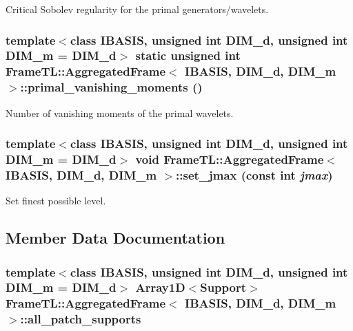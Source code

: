 Critical Sobolev regularity for the primal generators/wavelets. \hypertarget{classFrameTL_1_1AggregatedFrame_3057372270397c20f4705ac9281478e3}{
\subsubsection[{primal\_\-vanishing\_\-moments}]{\setlength{\rightskip}{0pt plus 5cm}template$<$class IBASIS, unsigned int DIM\_\-d, unsigned int DIM\_\-m = DIM\_\-d$>$ static unsigned int {\bf FrameTL::AggregatedFrame}$<$ IBASIS, DIM\_\-d, DIM\_\-m $>$::primal\_\-vanishing\_\-moments ()}}
\label{classFrameTL_1_1AggregatedFrame_3057372270397c20f4705ac9281478e3}


Number of vanishing moments of the primal wavelets. \hypertarget{classFrameTL_1_1AggregatedFrame_d27b0ed0194ad64fcc7c804c9027de33}{
\subsubsection[{set\_\-jmax}]{\setlength{\rightskip}{0pt plus 5cm}template$<$class IBASIS, unsigned int DIM\_\-d, unsigned int DIM\_\-m = DIM\_\-d$>$ void {\bf FrameTL::AggregatedFrame}$<$ IBASIS, DIM\_\-d, DIM\_\-m $>$::set\_\-jmax (const int {\em jmax})}}
\label{classFrameTL_1_1AggregatedFrame_d27b0ed0194ad64fcc7c804c9027de33}


Set finest possible level. 

\subsection{Member Data Documentation}
\hypertarget{classFrameTL_1_1AggregatedFrame_f7a07f1fdbbd8a04b594d043e273ed0f}{
\subsubsection[{all\_\-patch\_\-supports}]{\setlength{\rightskip}{0pt plus 5cm}template$<$class IBASIS, unsigned int DIM\_\-d, unsigned int DIM\_\-m = DIM\_\-d$>$ Array1D$<${\bf Support}$>$ {\bf FrameTL::AggregatedFrame}$<$ IBASIS, DIM\_\-d, DIM\_\-m $>$::{\bf all\_\-patch\_\-supports}}}
\label{classFrameTL_1_1AggregatedFrame_f7a07f1fdbbd8a04b594d043e273ed0f}


